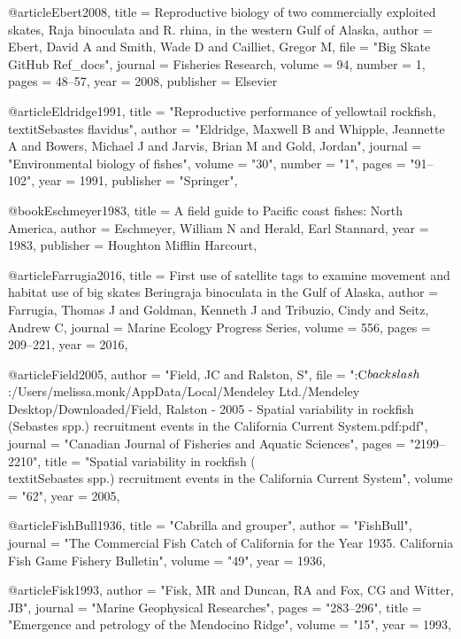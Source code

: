 @article{Ebert2008,
  title = {Reproductive biology of two commercially exploited skates, Raja binoculata and R. rhina, in the western Gulf of Alaska},
  author = {Ebert, David A and Smith, Wade D and Cailliet, Gregor M},
  file = "{Big Skate GitHub Ref_docs}",
  journal = {Fisheries Research},
  volume = {94},
  number = {1},
  pages = {48--57},
  year = 2008,
  publisher = {Elsevier}
}

@article{Eldridge1991,
    title = "{Reproductive performance of yellowtail rockfish, \\textit{{{Sebastes}} flavidus}}",
    author = "{Eldridge, Maxwell B and Whipple, Jeannette A and Bowers, Michael J and Jarvis, Brian M and Gold, Jordan}",
    journal = "{Environmental biology of fishes}",
    volume = "{30}",
    number = "{1}",
    pages = "{91--102}",
    year = 1991,
    publisher = "{Springer}",
}

@book{Eschmeyer1983,
  title = {A field guide to Pacific coast fishes: North America},
  author = {Eschmeyer, William N and Herald, Earl Stannard},
  year = 1983,
  publisher = {Houghton Mifflin Harcourt},
}

@article{Farrugia2016,
  title = {First use of satellite tags to examine movement and habitat use of big skates Beringraja binoculata in the Gulf of Alaska},
  author = {Farrugia, Thomas J and Goldman, Kenneth J and Tribuzio, Cindy and Seitz, Andrew C},
  journal = {Marine Ecology Progress Series},
  volume = {556},
  pages = {209--221},
  year = 2016,
}

@article{Field2005,
    author = "{Field, JC and Ralston, S}",
    file = "{:C$\\backslash$:/Users/melissa.monk/AppData/Local/Mendeley Ltd./Mendeley Desktop/Downloaded/Field, Ralston - 2005 - Spatial variability in rockfish (Sebastes spp.) recruitment events in the California Current System.pdf:pdf}",
    journal = "{Canadian Journal of Fisheries and Aquatic Sciences}",
    pages = "{2199--2210}",
    title = "{{Spatial variability in rockfish (\\textit{{Sebastes}} spp.) recruitment events in the California Current System}}",
    volume = "{62}",
    year = 2005,
}

@article{FishBull1936,
    title = "{Cabrilla and grouper}",
    author = "{FishBull}",
    journal = "{The Commercial Fish Catch of California for the Year 1935. California Fish Game Fishery Bulletin}",
    volume = "{49}",
    year = 1936,
}

@article{Fisk1993,
    author = "{Fisk, MR and Duncan, RA and Fox, CG and Witter, JB}",
    journal = "{Marine Geophysical Researches}",
    pages = "{283--296}",
    title = "{{Emergence and petrology of the Mendocino Ridge}}",
    volume = "{15}",
    year = 1993,
}




